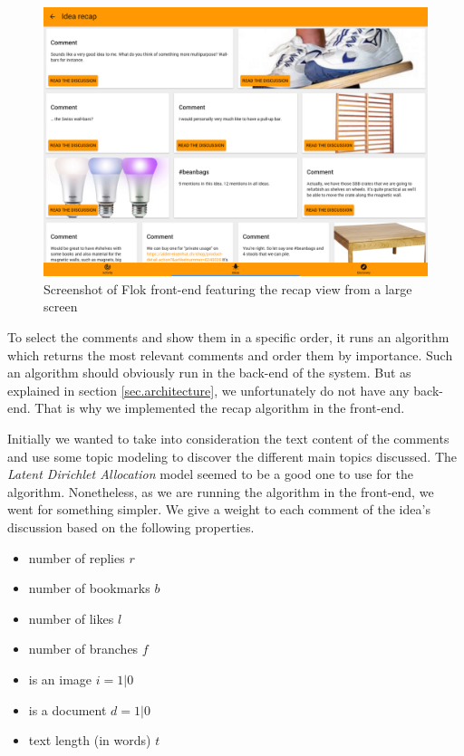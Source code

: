 \documentclass[a4paper,12pt,twoside]{article}
\begin{document}
\begin{figure}[!htb]
    \centering
    \includegraphics[width=\textwidth]{images/recapDesktop.png}
    \caption{Screenshot of Flok front-end featuring the recap view from a large screen}
    \label{fig.recap.desktop}
\end{figure}

To select the comments and show them in a specific order, it runs an algorithm which returns the most relevant comments and order them by importance.
Such an algorithm should obviously run in the back-end of the system.
But as explained in section \ref{sec.architecture}, we unfortunately do not have any back-end.
That is why we implemented the recap algorithm in the front-end.

Initially we wanted to take into consideration the text content of the comments and use some topic modeling to discover the different main topics discussed.
The \emph{Latent Dirichlet Allocation} \cite{blei2003latent} model seemed to be a good one to use for the algorithm.
Nonetheless, as we are running the algorithm in the front-end, we went for something simpler.
We give a weight to each comment of the idea's discussion based on the following properties.

\begin{multicols}{2}
    \begin{itemize}
        \item number of replies $r$
        \item number of bookmarks $b$
        \item number of likes $l$
        \item number of branches $f$
        \item is an image $i = 1 | 0$
        \item is a document $d = 1 | 0$
        \item text length (in words) $t$
    \end{itemize}
\end{multicols}
\end{document}
